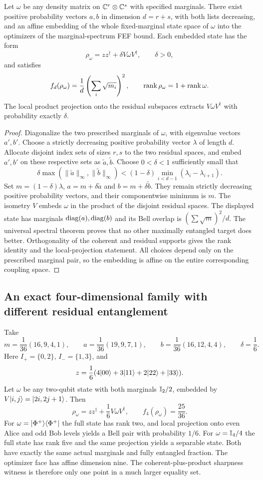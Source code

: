 \begin{theorem}\label{thm:universality}
Let $\omega$ be any density matrix on $\mathbb C^r\otimes\mathbb C^s$ with specified marginals. There exist positive probability vectors $a,b$ in dimension $d=r+s$, with both lists decreasing, and an affine embedding of the whole fixed-marginal state space of $\omega$ into the optimizers of the marginal-spectrum FEF bound. Each embedded state has the form
\[
 \rho_\omega=zz^\dagger+\delta V\omega V^\dagger,\qquad \delta>0,
\]
and satisfies
\[
 f_d(\rho_\omega)=\frac1d\left(\sum_i\sqrt{m_i}\right)^2,
 \qquad \operatorname{rank}\rho_\omega=1+\operatorname{rank}\omega.
\]
The local product projection onto the residual subspaces extracts $V\omega V^\dagger$ with probability exactly $\delta$.
\end{theorem}
\begin{proof}
Diagonalize the two prescribed marginals of $\omega$, with eigenvalue vectors $a',b'$. Choose a strictly decreasing positive probability vector $\lambda$ of length $d$. Allocate disjoint index sets of sizes $r,s$ to the two residual spaces, and embed $a',b'$ on these respective sets as $\widetilde a,\widetilde b$. Choose $0<\delta<1$ sufficiently small that
\[
 \delta\max(\|\widetilde a\|_\infty,\|\widetilde b\|_\infty)
 <(1-\delta)\min_{i<d-1}(\lambda_i-\lambda_{i+1}).
\]
Set $m=(1-\delta)\lambda$, $a=m+\delta\widetilde a$ and $b=m+\delta\widetilde b$. They remain strictly decreasing positive probability vectors, and their componentwise minimum is $m$. The isometry $V$ embeds $\omega$ in the product of the disjoint residual spaces. The displayed state has marginals $\operatorname{diag}(a),\operatorname{diag}(b)$ and its Bell overlap is $(\sum\sqrt m)^2/d$. The universal spectral theorem proves that no other maximally entangled target does better. Orthogonality of the coherent and residual supports gives the rank identity and the local-projection statement. All choices depend only on the prescribed marginal pair, so the embedding is affine on the entire corresponding coupling space.
\end{proof}

\subsection{An exact four-dimensional family with different residual entanglement}
Take
\[
 m=\frac1{36}(16,9,4,1),\qquad
 a=\frac1{36}(19,9,7,1),\qquad
 b=\frac1{36}(16,12,4,4),\qquad\delta=\frac16.
\]
Here $I_+=\{0,2\}$, $I_-=\{1,3\}$, and
\[
 z=\frac16(4\lvert 00\rangle+3\lvert 11\rangle+2\lvert 22\rangle+\lvert 33\rangle).
\]
Let $\omega$ be any two-qubit state with both marginals $\mathbb I_2/2$, embedded by $V\lvert i,j\rangle=\lvert 2i,2j+1\rangle$. Then
\[
 \rho_\omega=zz^\dagger+\frac16V\omega V^\dagger,
 \qquad \boxed{f_4(\rho_\omega)=\frac{25}{36}.}
\]
For $\omega=\lvert \Phi^+\rangle\langle \Phi^+\rvert$ the full state has rank two, and local projection onto even Alice and odd Bob levels yields a Bell pair with probability $1/6$. For $\omega=\mathbb I_4/4$ the full state has rank five and the same projection yields a separable state. Both have exactly the same actual marginals and fully entangled fraction. The optimizer face has affine dimension nine. The coherent-plus-product sharpness witness is therefore only one point in a much larger equality set.

